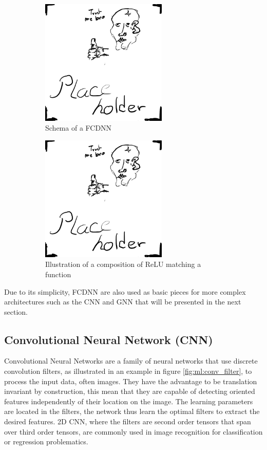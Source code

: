 \documentclass[../main.tex]{subfiles}
\begin{document}
\begin{figure}[ht]
  \begin{subfigure}[t]{0.48\textwidth}
    \centering
    \includegraphics[height=6cm]{images/placeholder.jpg}
    \caption{Schema of a FCDNN}
    \label{fig:ml:fcdnn}
  \end{subfigure}
  \hfill
  \begin{subfigure}[t]{0.48\textwidth}
    \centering
    \includegraphics[height=6cm]{images/placeholder.jpg}
    \caption{Illustration of a composition of ReLU matching a function}
    \label{fig:ml:relu-mimic}
  \end{subfigure}
  \caption{}
\end{figure}

Due to its simplicity, FCDNN are also used as basic pieces for more complex architectures such as the CNN and GNN that will be presented in the next section.

\subsection{Convolutional Neural Network (CNN)}
\label{sec:ml:cnn}

Convolutional Neural Networks are a family of neural networks that use discrete convolution filters, as illustrated in an example in figure \ref{fig:ml:conv_filter}, to process the input data, often images. They have the advantage to be translation invariant by construction, this mean that they are capable of detecting oriented features independently of their location on the image. The learning parameters are located in the filters, the network thus learn the optimal filters to extract the desired features. 2D CNN, where the filters are second order tensors that span over third order tensors, are commonly used in image recognition \cite{russakovsky_imagenet_2015} for classification or regression problematics.
\end{document}
